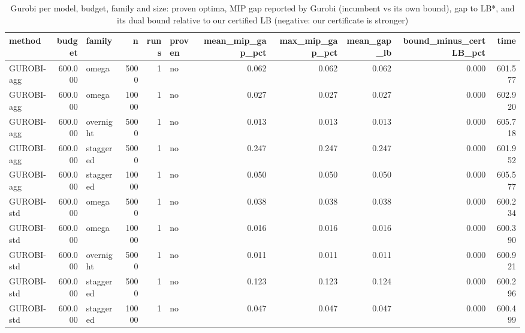 \begin{table}[htbp]
\centering
\small
\caption{Gurobi per model, budget, family and size: proven optima, MIP gap reported by Gurobi (incumbent vs its own bound), gap to LB*, and its dual bound relative to our certified LB (negative: our certificate is stronger)}
\label{tab:E3x_long_runs_xlarge_gurobi}
\begin{tabular}{lrlrrlrrrrr}
\toprule
method & budget & family & n & runs & proven & mean\_mip\_gap\_pct & max\_mip\_gap\_pct & mean\_gap\_lb & bound\_minus\_certLB\_pct & time \\
\midrule
GUROBI-agg & 600.000 & omega & 5000 & 1 & no & 0.062 & 0.062 & 0.062 & 0.000 & 601.577 \\
GUROBI-agg & 600.000 & omega & 10000 & 1 & no & 0.027 & 0.027 & 0.027 & 0.000 & 602.920 \\
GUROBI-agg & 600.000 & overnight & 5000 & 1 & no & 0.013 & 0.013 & 0.013 & 0.000 & 605.718 \\
GUROBI-agg & 600.000 & staggered & 5000 & 1 & no & 0.247 & 0.247 & 0.247 & 0.000 & 601.952 \\
GUROBI-agg & 600.000 & staggered & 10000 & 1 & no & 0.050 & 0.050 & 0.050 & 0.000 & 605.577 \\
GUROBI-std & 600.000 & omega & 5000 & 1 & no & 0.038 & 0.038 & 0.038 & 0.000 & 600.234 \\
GUROBI-std & 600.000 & omega & 10000 & 1 & no & 0.016 & 0.016 & 0.016 & 0.000 & 600.390 \\
GUROBI-std & 600.000 & overnight & 5000 & 1 & no & 0.011 & 0.011 & 0.011 & 0.000 & 600.921 \\
GUROBI-std & 600.000 & staggered & 5000 & 1 & no & 0.123 & 0.123 & 0.124 & 0.000 & 600.296 \\
GUROBI-std & 600.000 & staggered & 10000 & 1 & no & 0.047 & 0.047 & 0.047 & 0.000 & 600.499 \\
\bottomrule
\end{tabular}
\end{table}
